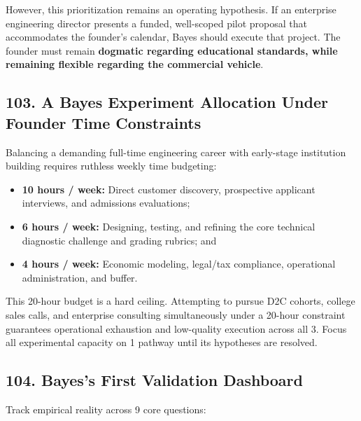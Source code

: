 However, this prioritization remains an operating hypothesis. If an enterprise engineering director presents a funded, well-scoped pilot proposal that accommodates the founder's calendar, Bayes should execute that project. The founder must remain \textbf{dogmatic regarding educational standards, while remaining flexible regarding the commercial vehicle}.

\subsection*{103. A Bayes Experiment Allocation Under Founder Time Constraints}

Balancing a demanding full-time engineering career with early-stage institution building requires ruthless weekly time budgeting:

\begin{itemize}
    \item \textbf{10 hours / week:} Direct customer discovery, prospective applicant interviews, and admissions evaluations;
    \item \textbf{6 hours / week:} Designing, testing, and refining the core technical diagnostic challenge and grading rubrics; and
    \item \textbf{4 hours / week:} Economic modeling, legal/tax compliance, operational administration, and buffer.
\end{itemize}

This 20-hour budget is a hard ceiling. Attempting to pursue D2C cohorts, college sales calls, and enterprise consulting simultaneously under a 20-hour constraint guarantees operational exhaustion and low-quality execution across all 3. Focus all experimental capacity on 1 pathway until its hypotheses are resolved.

\subsection*{104. Bayes's First Validation Dashboard}

Track empirical reality across 9 core questions:

